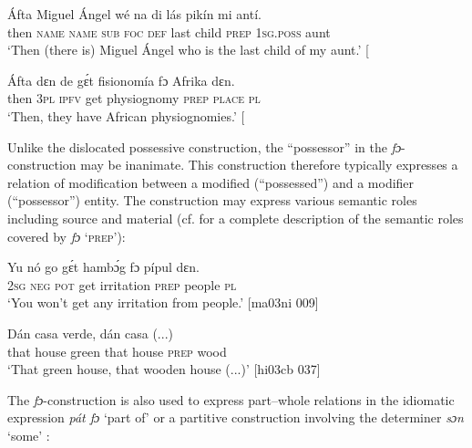 \ea%
    \label{ex:key:242}
    \gll \'{A}fta    Miguel  Ángel  wé  na  di  lás  pikín   mi    antí.\\
then  \textsc{name}  \textsc{name}  \textsc{sub}  \textsc{foc}  \textsc{def}  last  child  \textsc{prep}  \textsc{1sg.poss}  aunt\\

\glt ‘Then (there is) Miguel Ángel who is the last child of my aunt.’ [\textstylePichiexamplenumberZchnZchn{fr03ft 143]}
\z


\ea%
    \label{ex:key:243}
    \gll \'{A}fta    dɛn  de  gɛ́t  fisionomía  fɔ  Afrika  dɛn.\\
then  \textsc{3pl}  \textsc{ipfv}  get  physiognomy  \textsc{prep}  \textsc{place}  \textsc{pl}\\

\glt ‘Then, they have African physiognomies.’ [\textstylePichiexamplenumberZchnZchn{ed03sp 031]}
\z

Unlike the dislocated possessive construction, the “possessor” in the \textit{fɔ}{}-construction may be inanimate. This construction therefore typically expresses a relation of modification between a modified (“possessed”) and a modifier (“possessor”) entity. The construction may express various semantic roles including source\index{}  and material\index{}  (cf.  for a complete description of the semantic roles covered by \textit{fɔ} ‘\textsc{prep’}):


\ea%
    \label{ex:key:244}
    \gll Yu  nó  go  gɛ́t  hambɔ́g  fɔ  pípul  dɛn.\\
\textsc{2sg}  \textsc{neg}  \textsc{pot}  get  irritation  \textsc{prep}  people  \textsc{pl}\\

\glt ‘You won’t get any irritation from people.’ [ma03ni 009]
\z


\ea%
    \label{ex:key:245}
    \gll Dán  casa    verde,  dán  casa        (...)\\
that  house  green  that  house  \textsc{prep}  wood\\

\glt ‘That green house, that wooden house (...)’ [hi03cb 037]
\z

The \textit{fɔ}{}-construction is also used to express part–whole relations in the idiomatic expression \textit{pát fɔ} ‘part of’  or a partitive construction involving the determiner \textit{sɔn} ‘some’ : 


